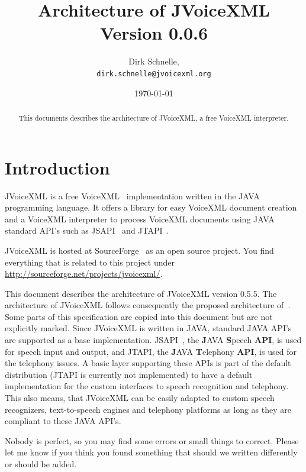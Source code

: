 \documentclass[11pt,a4paper]{article}
\title{Architecture of JVoiceXML \\
Version 0.0.6}
\author{Dirk Schnelle,  \\
  \texttt{dirk.schnelle@jvoicexml.org} }
\date{\today}
\begin{document}
\pagestyle{headings}

\maketitle

\begin{abstract}
This documents describes the architecture of JVoiceXML, a free
VoiceXML interpreter.
\end{abstract}

\tableofcontents

\section{Introduction}
\label{sec:introduction}

JVoiceXML is a free VoiceXML~\cite{w3.org:voicexml} implementation written in 
the JAVA programming language. It offers a library for easy VoiceXML
document creation and a VoiceXML interpreter to process 
VoiceXML documents using JAVA standard API's such as JSAPI~\cite{sun:jsapi} and
JTAPI~\cite{sun:jsapi}.

JVoiceXML is hosted at SourceForge~\cite{sourceforge} as an open source 
project.
You find everything that is related to this project under
\url{http://sourceforge.net/projects/jvoicexml/}.

This document describes the architecture of JVoiceXML version 0.5.5. The
architecture of JVoiceXML follows
consequently the proposed architecture of~\cite{w3.org:voicexml}.
Some parts of this specification are copied into this document
but are not explicitly marked.
Since JVoiceXML is written in JAVA, standard JAVA API's are supported as a base
implementation. JSAPI~\cite{sun:jsapi}, the \textbf{J}AVA \textbf{S}peech
\textbf{API}, is used for speech input and output,
and JTAPI, the \textbf{J}AVA \textbf{T}elephony \textbf{API}, is used for the 
telephony issues. 
A basic layer supporting these APIs is part of the default distribution (JTAPI
is currently not implemented) to have a default implementation for the custom
interfaces to speech recognition and telephony. This
also means, that JVoiceXML can be easily adapted to custom speech recognizers,
text-to-speech engines and telephony platforms as long as they
are compliant to these JAVA API's.

Nobody is perfect, so you may find some errors or small things to correct.
Please let me know if you think you found something that should we written
differently or should be added.
\end{document}
